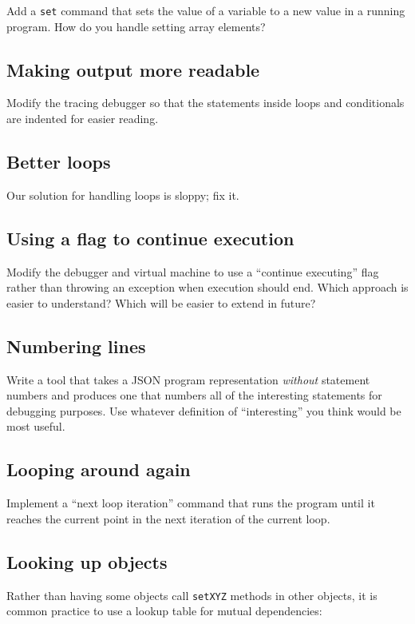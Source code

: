 \documentclass[krantzl]{krantz}
\begin{document}
Add a \texttt{set} command that sets the value of a variable to a new value in a running program.
How do you handle setting array elements?

\subsection*{Making output more readable}


Modify the tracing debugger so that
the statements inside loops and conditionals are indented for easier reading.

\subsection*{Better loops}


Our solution for handling loops is sloppy; fix it.

\subsection*{Using a flag to continue execution}


Modify the debugger and virtual machine to use a “continue executing” flag
rather than throwing an exception when execution should end.
Which approach is easier to understand?
Which will be easier to extend in future?

\subsection*{Numbering lines}


Write a tool that takes a JSON program representation \emph{without} statement numbers
and produces one that numbers all of the interesting statements for debugging purposes.
Use whatever definition of “interesting” you think would be most useful.

\subsection*{Looping around again}


Implement a “next loop iteration” command that runs the program
until it reaches the current point in the next iteration of the current loop.

\subsection*{Looking up objects}


Rather than having some objects call \texttt{setXYZ} methods in other objects,
it is common practice to use a lookup table for mutual dependencies:
\end{document}
